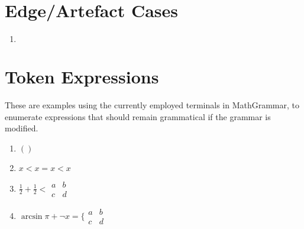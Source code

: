 \documentclass{article}
\def\mockarray{\begin{array}{cc} 
  a & b \\
  c & d \end{array}}
\begin{document}
\section{Edge/Artefact Cases}
\begin{enumerate}
  \item $\,$  %
\end{enumerate}

\section{Token Expressions}

\def\ATOM{\frac{1}{2}}
\def\UNKNOWN{x}
\def\ID{\infty}
\def\ARRAY{\mockarray}
\def\NUMBER{\pi}
\def\PUNCT{,}
\def\PERIOD{.}
\def\RELOP{<}
\def\LANGLE{\langle}
\def\RANGLE{\rangle}
\def\MIDBAR{\bigm{|}}
\def\LBRACE{\{}
\def\RBRACE{\}}
\def\METARELOP{=}
\def\MODIFIEROP{\mod}
\def\MODIFIER{\pod{3}}
\def\ARROW{\uparrow}
\def\ADDOP{+}
\def\MULOP{\times}
\def\FRACOP{/}
\def\BINOP{\mathbin{@}}
\def\POSTFIX{!}
\def\FUNCTION{\neg}
\def\OPFUNCTION{\arcsin}
\def\TRIGFUNCTION{\sin}
\def\APPLYOP{\@APPLYFUNCTION} %
\lxDeclare[role=COMPOSEOP,meaning=compose]{$*$} %
\def\COMPOSEOP{*}
\def\SUPOP{\prime}
\def\OPEN{(}
\def\CLOSE{)}
\def\SCRIPTOPEN{\{}
\def\MIDDLE{\bigm{m}}
\def\VERTBAR{||}
\def\SINGLEVERTBAR{|}
\def\BIGOP{\forall}
\def\SUMOP{\sum}
\def\INTOP{\int}
\def\LIMITOP{\lim}
\def\DIFFOP{d}
\def\OPERATOR{\partial}
\def\POSTSUBSCRIPT{_}
\def\POSTSUPERSCRIPT{^}
\def\FLOATSUBSCRIPT{_}
\def\FLOATSUPERSCRIPT{^}

These are examples using the currently employed terminals in MathGrammar, to enumerate expressions that should remain grammatical if the grammar is modified.

\begin{enumerate}
  \item $\OPEN \CLOSE$
  \item $\UNKNOWN \RELOP \UNKNOWN \METARELOP \UNKNOWN \RELOP \UNKNOWN$
  \item $\ATOM \ADDOP \ATOM \RELOP \ARRAY$
  \item $\OPFUNCTION \NUMBER \ADDOP \FUNCTION \UNKNOWN \METARELOP \LBRACE \ARRAY$


\end{enumerate}

\end{document}
